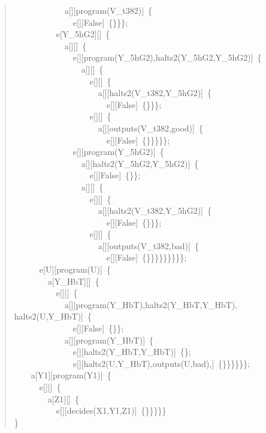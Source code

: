 \begin{quote}
{~~~~~~~~~~~~a[][program(V\_t382)]~\{\\
~~~~~~~~~~~~~~e[][False]~\{\}\}\};\\
~~~~~~~~~~e[Y\_5hG2][]~\{\\
~~~~~~~~~~~~a[][]~\{\\
~~~~~~~~~~~~~~e[][program(Y\_5hG2),halts2(Y\_5hG2,Y\_5hG2)]~\{\\
~~~~~~~~~~~~~~~~a[][]~\{\\
~~~~~~~~~~~~~~~~~~e[][]~\{\\
~~~~~~~~~~~~~~~~~~~~a[][halts2(V\_t382,Y\_5hG2)]~\{\\
~~~~~~~~~~~~~~~~~~~~~~e[][False]~\{\}\}\};\\
~~~~~~~~~~~~~~~~~~e[][]~\{\\
~~~~~~~~~~~~~~~~~~~~a[][outputs(V\_t382,good)]~\{\\
~~~~~~~~~~~~~~~~~~~~~~e[][False]~\{\}\}\}\}\};\\
~~~~~~~~~~~~~~e[][program(Y\_5hG2)]~\{\\
~~~~~~~~~~~~~~~~a[][halts2(Y\_5hG2,Y\_5hG2)]~\{\\
~~~~~~~~~~~~~~~~~~e[][False]~\{\}\};\\
~~~~~~~~~~~~~~~~a[][]~\{\\
~~~~~~~~~~~~~~~~~~e[][]~\{\\
~~~~~~~~~~~~~~~~~~~~a[][halts2(V\_t382,Y\_5hG2)]~\{\\
~~~~~~~~~~~~~~~~~~~~~~e[][False]~\{\}\}\};\\
~~~~~~~~~~~~~~~~~~e[][]~\{\\
~~~~~~~~~~~~~~~~~~~~a[][outputs(V\_t382,bad)]~\{\\
~~~~~~~~~~~~~~~~~~~~~~e[][False]~\{\}\}\}\}\}\}\}\}\};\\
~~~~~~e[U][program(U)]~\{\\
~~~~~~~~a[Y\_HbT][]~\{\\
~~~~~~~~~~e[][]~\{\\
~~~~~~~~~~~~a[][program(Y\_HbT),halts2(Y\_HbT,Y\_HbT),\\ halts2(U,Y\_HbT)]~\{\\
~~~~~~~~~~~~~~e[][False]~\{\}\};\\
~~~~~~~~~~~~a[][program(Y\_HbT)]~\{\\
~~~~~~~~~~~~~~e[][halts2(Y\_HbT,Y\_HbT)]~\{\};\\
~~~~~~~~~~~~~~e[][halts2(U,Y\_HbT),outputs(U,bad),]~\{\}\}\}\}\}\};\\
~~~~a[Y1][program(Y1)]~\{\\
~~~~~~e[][]~\{\\
~~~~~~~~a[Z1][]~\{\\
~~~~~~~~~~e[][decides(X1,Y1,Z1)]~\{\}\}\}\}\}\\
\}\\
}
\end{quote}


